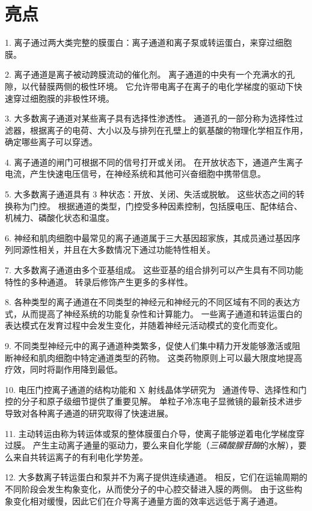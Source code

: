\section{亮点}


1. 离子通过两大类完整的膜蛋白：离子通道和离子泵或转运蛋白，来穿过细胞膜。


2. 离子通道是离子被动跨膜流动的催化剂。
离子通道的中央有一个充满水的孔隙，以代替膜两侧的极性环境。
它允许带电离子在离子的电化学梯度的驱动下快速穿过细胞膜的非极性环境。


3. 大多数离子通道对某些离子具有选择性渗透性。
通道孔的一部分称为选择性过滤器，根据离子的电荷、大小以及与排列在孔壁上的氨基酸的物理化学相互作用，确定哪些离子可以穿透。


4. 离子通道的闸门可根据不同的信号打开或关闭。
在开放状态下，通道产生离子电流，产生快速电压信号，在神经系统和其他可兴奋细胞中携带信息。


5. 大多数离子通道具有 3 种状态：开放、关闭、失活或脱敏。
这些状态之间的转换称为门控。
根据通道的类型，门控受多种因素控制，包括膜电压、配体结合、机械力、磷酸化状态和温度。


6. 神经和肌肉细胞中最常见的离子通道属于三大基因超家族，其成员通过基因序列同源性相关，并且在大多数情况下通过功能特性相关。


7. 大多数离子通道由多个亚基组成。
这些亚基的组合排列可以产生具有不同功能特性的多种通道。
转录后修饰产生更多的多样性。


8. 各种类型的离子通道在不同类型的神经元和神经元的不同区域有不同的表达方式，从而提高了神经系统的功能复杂性和计算能力。
一些离子通道和转运蛋白的表达模式在发育过程中会发生变化，并随着神经元活动模式的变化而变化。


9. 不同类型神经元中的离子通道种类繁多，促使人们集中精力开发能够激活或阻断神经和肌肉细胞中特定通道类型的药物。
这类药物原则上可以最大限度地提高疗效，同时将副作用降到最低。


10. 电压门控离子通道的结构功能和 X 射线晶体学研究为~ 通道传导、选择性和门控的分子和原子级细节提供了重要见解。
单粒子冷冻电子显微镜的最新技术进步导致对各种离子通道的研究取得了快速进展。


11. 主动转运由称为转运体或泵的整体膜蛋白介导，使离子能够逆着电化学梯度穿过膜。
产生主动离子通量的驱动力，要么来自化学能（\textit{三磷酸腺苷酶}的水解），要么来自共转运离子的有利电化学势差。


12. 大多数离子转运蛋白和泵并不为离子提供连续通道。
相反，它们在运输周期的不同阶段会发生构象变化，从而使分子的中心腔交替进入膜的两侧。
由于这些构象变化相对缓慢，因此它们在介导离子通量方面的效率远远低于离子通道。



